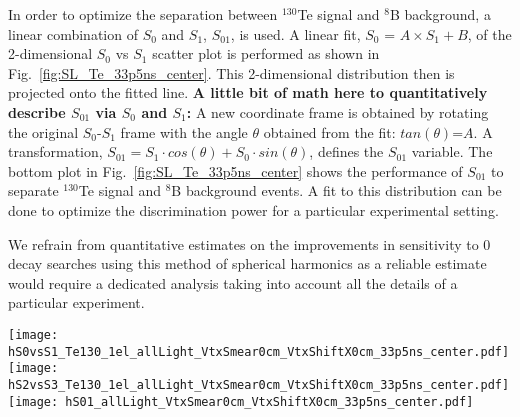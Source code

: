 In order to optimize the separation between $^{130}$Te signal and $^{8}$B
background, a linear combination of $S_0$ and $S_1$, $S_{01}$, is
used. A linear fit, $S_0$ = $A \times S_1 + B$, of the 2-dimensional $S_0$
vs $S_1$ scatter plot is performed as shown in
Fig.~\ref{fig:SL_Te_33p5ns_center}.  This 2-dimensional
distribution then is projected onto the fitted line. {\bf A little bit of
  math here to quantitatively describe $S_{01}$ via $S_0$ and $S_1$:}
A new coordinate frame is obtained by rotating the original
$S_0$-$S_1$ frame with the angle $\theta$ obtained from the fit:
$tan(\theta)$=$A$. A transformation, $S_{01} = S_1 \cdot cos(\theta) +
S_0 \cdot sin(\theta)$, defines the $S_{01}$ variable. The bottom plot in Fig.~\ref{fig:SL_Te_33p5ns_center} 
shows the performance of $S_{01}$ to separate $^{130}$Te signal and $^{8}$B
background events. A fit to this distribution can be done to optimize the
discrimination power for a particular experimental setting.

We refrain from quantitative estimates on the improvements in sensitivity
to 0{\nbb} decay searches using this method of spherical harmonics as a
reliable estimate would require a dedicated analysis taking into
account all the details of a particular experiment.

\begin{figure*}[h]
  \centering
  \texttt{[image: hS0vsS1\_Te130\_1el\_allLight\_VtxSmear0cm\_VtxShiftX0cm\_33p5ns\_center.pdf]}
  \texttt{[image: hS2vsS3\_Te130\_1el\_allLight\_VtxSmear0cm\_VtxShiftX0cm\_33p5ns\_center.pdf]}
  \texttt{[image: hS01\_allLight\_VtxSmear0cm\_VtxShiftX0cm\_33p5ns\_center.pdf]}
  \caption{Spherical harmonics comparison between $^{130}$Te 0{\nbb}
    decay signal ($Q=2.529$~MeV) (\emph{red}) and $^{8}$B solar
    neutrinos background (\emph{blue}) for 1000 simulated events
    originated at the center of the sphere. $^{8}$B events are
    implemented as 2.529~MeV electrons with initial direction along
    $x$-axis. Perfect vertex reconstruction - true vertex position is
    used. Time cut of 33.5~ns on the photon arrival time is
    applied. \emph{Top left:} $S_0$ versus $S_1$ scatter plot. Black
    dotted line is a linear fit of these 2D histograms. Variable
    $S_{01}$ is defined as a projection of 2D distribution onto this
    linear fit. \emph{Top right:} $S_2$ versus $S_3$ scatter
    plot. \emph{Bottom:} $S_{01}$ distribution for the signal and
    background.}
\label{fig:SL_Te_33p5ns_center}
\end{figure*}


